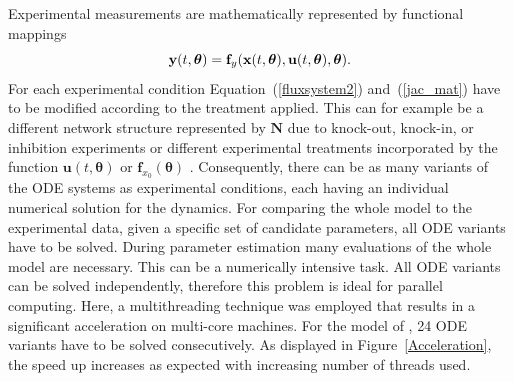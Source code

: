 \documentclass[12pt,a4paper]{scrartcl}
\begin{document}
Experimental measurements are mathematically represented by functional mappings
\begin{equation}
    {\bf y}(t,{\boldsymbol \theta}) = {\bf f}_y({\bf x}(t,{\boldsymbol \theta}),{\bf u}(t,{\boldsymbol 
\theta}),{\boldsymbol \theta}). \label{eq:obs}
\end{equation}
For each experimental condition Equation~(\ref{fluxsystem2}) and~(\ref{jac_mat}) have to 
be modified according to the treatment applied. This can for example be a different 
network structure represented by $\mathbf{N}$ due to knock-out, knock-in, or inhibition 
experiments or different experimental treatments incorporated by the function $\mathbf{u}
(t, \boldsymbol{\theta})$ or $\mathbf{f}_{x_0}(\boldsymbol{\theta})$ . Consequently, there 
can be as many variants of the ODE systems as experimental conditions, each having an 
individual numerical solution for the dynamics. For comparing the whole model to 
the experimental data, given a specific set of candidate parameters, all ODE variants have 
to be solved. During parameter estimation many evaluations of the whole model are 
necessary. This can be a numerically intensive task. All ODE variants can be solved 
independently, therefore this problem is ideal for parallel computing. Here, a multithreading 
technique was employed that results in a significant acceleration on multi-core machines. 
For the model of \citet{Bachmann:2011fk}, 24 ODE variants have to be solved consecutively. 
As displayed in Figure~\ref{Acceleration}, the speed up increases as expected with 
increasing number of threads used.
\end{document}
